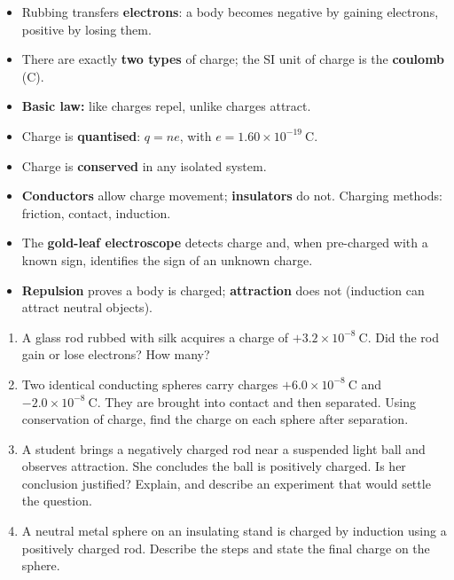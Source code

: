 \documentclass[11pt]{article}
\begin{document}
\begin{aretenir}
\begin{itemize}
\item Rubbing transfers \textbf{electrons}: a body becomes negative by gaining electrons, positive by losing them.
\item There are exactly \textbf{two types} of charge; the SI unit of charge is the \textbf{coulomb} (C).
\item \textbf{Basic law:} like charges repel, unlike charges attract.
\item Charge is \textbf{quantised}: $q = ne$, with $e = 1.60\times 10^{-19}\ \mathrm{C}$.
\item Charge is \textbf{conserved} in any isolated system.
\item \textbf{Conductors} allow charge movement; \textbf{insulators} do not. Charging methods: friction, contact, induction.
\item The \textbf{gold-leaf electroscope} detects charge and, when pre-charged with a known sign, identifies the sign of an unknown charge.
\item \textbf{Repulsion} proves a body is charged; \textbf{attraction} does not (induction can attract neutral objects).
\end{itemize}
\end{aretenir}

\begin{exercice}
\begin{enumerate}
\item A glass rod rubbed with silk acquires a charge of $+3.2\times 10^{-8}\ \mathrm{C}$. Did the rod gain or lose electrons? How many?
\item Two identical conducting spheres carry charges $+6.0\times 10^{-8}\ \mathrm{C}$ and $-2.0\times 10^{-8}\ \mathrm{C}$. They are brought into contact and then separated. Using conservation of charge, find the charge on each sphere after separation.
\item A student brings a negatively charged rod near a suspended light ball and observes attraction. She concludes the ball is positively charged. Is her conclusion justified? Explain, and describe an experiment that would settle the question.
\item A neutral metal sphere on an insulating stand is charged by induction using a positively charged rod. Describe the steps and state the final charge on the sphere.
\end{enumerate}
\end{exercice}
\end{document}
